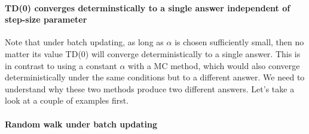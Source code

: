 \documentclass[12pt]{article}
\begin{document}
\paragraph{TD(0) converges determinstically to a single answer independent of   step-size parameter}
Note that under batch updating, as long as $\alpha$ is chosen sufficiently small, then no matter its value TD(0) will converge deterministically to a single answer. This is in contrast to using a constant $\alpha$ with a MC method, which would also converge deterministically under the same conditions but to a different answer. We need to understand why these two methods produce two different answers. Let's take a look at a couple of examples first.

\paragraph{Random walk under batch updating} 
\end{document}
